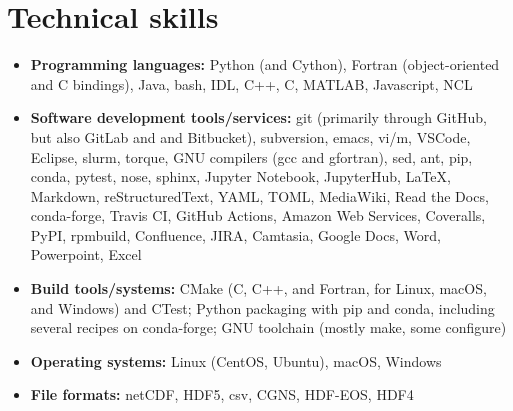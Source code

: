 \section{Technical skills}
\vspace{0.5em}

\begin{itemize}

  \item \textbf{Programming languages:} Python (and Cython),
    Fortran (object-oriented and C bindings), Java, bash,
    IDL, C++, C, MATLAB, Javascript, NCL

  \item \textbf{Software development tools/services:} git (primarily through
    GitHub, but also GitLab and and Bitbucket), subversion, emacs,
    vi/m, VSCode, Eclipse, slurm, torque, GNU compilers (gcc and gfortran), sed,
    ant, pip, conda, pytest, nose, sphinx, Jupyter Notebook, JupyterHub, \LaTeX,
    Markdown, reStructuredText, YAML, TOML, MediaWiki, Read the Docs,
    conda-forge, {Travis CI}, {GitHub Actions}, {Amazon Web Services},
    Coveralls, PyPI, rpmbuild, Confluence, JIRA, Camtasia, Google Docs, Word,
    Powerpoint, Excel

  \item \textbf{Build tools/systems:} CMake (C, C++, and Fortran, for Linux, macOS,
    and Windows) and CTest; Python packaging with pip and conda, including
    several recipes on conda-forge; GNU toolchain (mostly make, some configure)

  \item \textbf{Operating systems:} Linux (CentOS, Ubuntu), macOS, Windows

  \item \textbf{File formats:} netCDF, HDF5, csv, CGNS, HDF-EOS, HDF4

\end{itemize}
